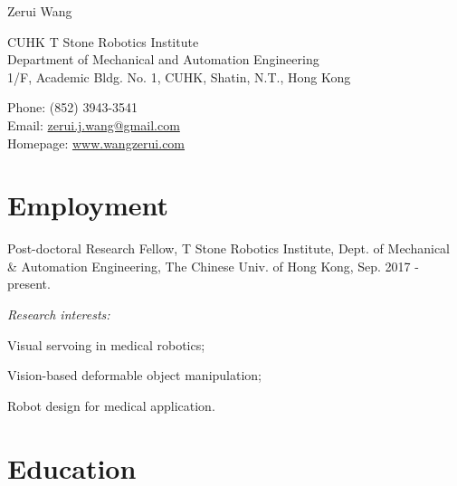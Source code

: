 \documentclass[10pt,letterpaper]{article}
\def\name{Zerui Wang}
\renewenvironment{itemize}{
\begin{list}{}{
    \setlength{\leftmargin}{1.5em}
    \setlength{\itemsep}{0.25em}
    \setlength{\parskip}{0pt}
    \setlength{\parsep}{0.25em}
    }
    }{
\end{list}
}
\begin{document}
{\huge \name}


\bigskip

\begin{minipage}[t]{0.595\textwidth}
    CUHK T Stone Robotics Institute \\
    Department of Mechanical and Automation Engineering \\
    1/F, Academic Bldg. No. 1, CUHK, Shatin, N.T., Hong Kong
\end{minipage}
\begin{minipage}[t]{0.395\textwidth}
    Phone: (852) 3943-3541 \\
    Email: \href{mailto:zerui.j.wang@gmail.com}{zerui.j.wang@gmail.com} \\
    Homepage: \href{http://www.wangzerui.com/}{www.wangzerui.com}
\end{minipage}

\section*{Employment}

\begin{itemize}
    \item Post-doctoral Research Fellow, T Stone Robotics Institute, Dept. of Mechanical \& Automation Engineering, The Chinese Univ. of Hong Kong, Sep. 2017 - present.
    \begin{itemize}
        \item \emph{Research interests:}
        \begin{itemize}
            \item Visual servoing in medical robotics;
            \item Vision-based deformable object manipulation;
            \item Robot design for medical application.
        \end{itemize}
    \end{itemize}
\end{itemize}

\section*{Education}
\end{document}
